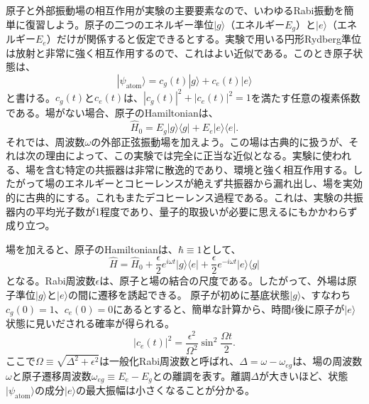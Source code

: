 原子と外部振動場の相互作用が実験の主要要素なので、いわゆるRabi振動を簡単に復習しよう。原子の二つのエネルギー準位$|g\rangle$（エネルギー$E_g$）と$|e\rangle$（エネルギー$E_e$）だけが関係すると仮定できるとする。実験で用いる円形Rydberg準位は放射と非常に強く相互作用するので、これはよい近似である。このとき原子状態は、
\begin{equation}
|\psi_{\mathrm{atom}}\rangle=c_g(t)|g\rangle+c_e(t)|e\rangle\tag{6.4}
\end{equation}
と書ける。$c_g(t)$と$c_e(t)$は、$|c_g(t)|^2+|c_e(t)|^2=1$を満たす任意の複素係数である。場がない場合、原子のHamiltonianは、
\begin{equation}
\hat H_0=E_g|g\rangle\langle g|+E_e|e\rangle\langle e|.\tag{6.5}
\end{equation}
それでは、周波数$\omega$の外部正弦振動場を加えよう。この場は古典的に扱うが、それは次の理由によって、この実験では完全に正当な近似となる。実験に使われる、場を含む特定の共振器は非常に散逸的であり、環境と強く相互作用する。したがって場のエネルギーとコヒーレンスが絶えず共振器から漏れ出し、場を実効的に古典的にする。これもまたデコヒーレンス過程である\cite{ref249}。これは、実験の共振器内の平均光子数が1程度であり、量子的取扱いが必要に思えるにもかかわらず成り立つ。

場を加えると、原子のHamiltonianは、$\hbar\equiv1$として、
\begin{equation}
\hat H=\hat H_0+\frac\epsilon2e^{i\omega t}|g\rangle\langle e|+\frac\epsilon2e^{-i\omega t}|e\rangle\langle g|\tag{6.6}
\end{equation}
となる。Rabi周波数$\epsilon$は、原子と場の結合の尺度である。したがって、外場は原子準位$|g\rangle$と$|e\rangle$の間に遷移を誘起できる。
\hypertarget{srcpage:247}{}\label{srcpage:247}
原子が初めに基底状態$|g\rangle$、すなわち$c_g(0)=1$、$c_e(0)=0$にあるとすると、簡単な計算から、時間$t$後に原子が$|e\rangle$状態に見いだされる確率が得られる。
\begin{equation}
|c_e(t)|^2=\frac{\epsilon^2}{\Omega^2}\sin^2\frac{\Omega t}{2}.\tag{6.7}
\end{equation}
ここで$\Omega\equiv\sqrt{\Delta^2+\epsilon^2}$は一般化Rabi周波数と呼ばれ、$\Delta=\omega-\omega_{eg}$は、場の周波数$\omega$と原子遷移周波数$\omega_{eg}\equiv E_e-E_g$との離調を表す。離調$\Delta$が大きいほど、状態$|\psi_{\mathrm{atom}}\rangle$の成分$|e\rangle$の最大振幅は小さくなることが分かる。


